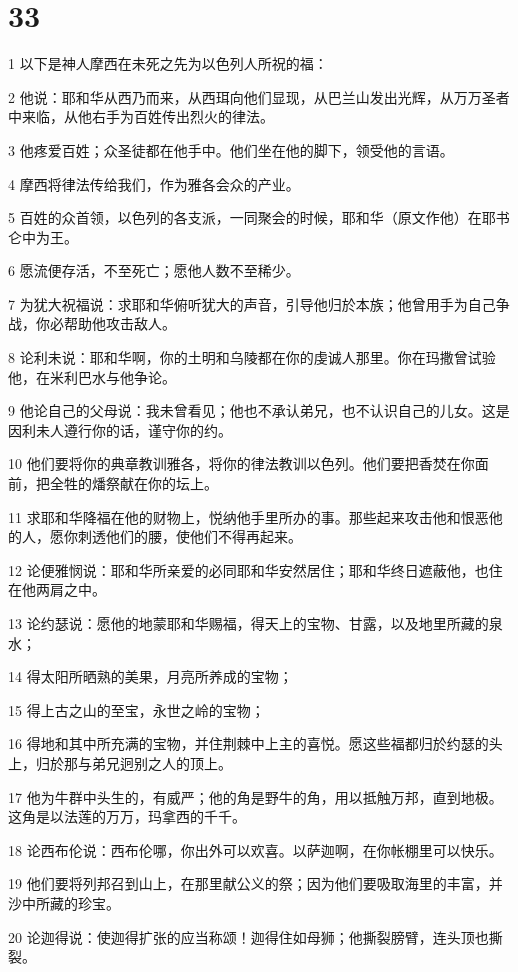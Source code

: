 \chapter{33}

\par 1 以下是神人摩西在未死之先为以色列人所祝的福：
\par 2 他说：耶和华从西乃而来，从西珥向他们显现，从巴兰山发出光辉，从万万圣者中来临，从他右手为百姓传出烈火的律法。
\par 3 他疼爱百姓；众圣徒都在他手中。他们坐在他的脚下，领受他的言语。
\par 4 摩西将律法传给我们，作为雅各会众的产业。
\par 5 百姓的众首领，以色列的各支派，一同聚会的时候，耶和华（原文作他）在耶书仑中为王。
\par 6 愿流便存活，不至死亡；愿他人数不至稀少。
\par 7 为犹大祝福说：求耶和华俯听犹大的声音，引导他归於本族；他曾用手为自己争战，你必帮助他攻击敌人。
\par 8 论利未说：耶和华啊，你的土明和乌陵都在你的虔诚人那里。你在玛撒曾试验他，在米利巴水与他争论。
\par 9 他论自己的父母说：我未曾看见；他也不承认弟兄，也不认识自己的儿女。这是因利未人遵行你的话，谨守你的约。
\par 10 他们要将你的典章教训雅各，将你的律法教训以色列。他们要把香焚在你面前，把全牲的燔祭献在你的坛上。
\par 11 求耶和华降福在他的财物上，悦纳他手里所办的事。那些起来攻击他和恨恶他的人，愿你刺透他们的腰，使他们不得再起来。
\par 12 论便雅悯说：耶和华所亲爱的必同耶和华安然居住；耶和华终日遮蔽他，也住在他两肩之中。
\par 13 论约瑟说：愿他的地蒙耶和华赐福，得天上的宝物、甘露，以及地里所藏的泉水；
\par 14 得太阳所晒熟的美果，月亮所养成的宝物；
\par 15 得上古之山的至宝，永世之岭的宝物；
\par 16 得地和其中所充满的宝物，并住荆棘中上主的喜悦。愿这些福都归於约瑟的头上，归於那与弟兄迥别之人的顶上。
\par 17 他为牛群中头生的，有威严；他的角是野牛的角，用以抵触万邦，直到地极。这角是以法莲的万万，玛拿西的千千。
\par 18 论西布伦说：西布伦哪，你出外可以欢喜。以萨迦啊，在你帐棚里可以快乐。
\par 19 他们要将列邦召到山上，在那里献公义的祭；因为他们要吸取海里的丰富，并沙中所藏的珍宝。
\par 20 论迦得说：使迦得扩张的应当称颂！迦得住如母狮；他撕裂膀臂，连头顶也撕裂。
